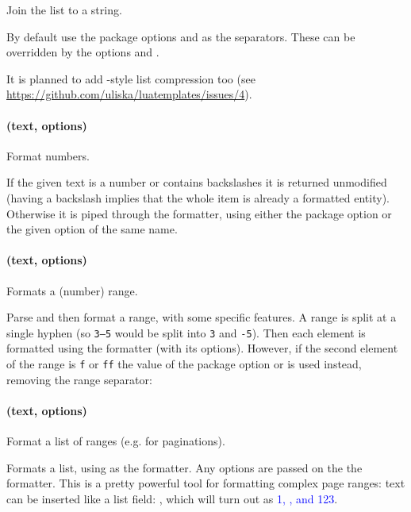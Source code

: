 \documentclass{scrartcl}
\begin{document}
Join the list to a string.

By default use the package options  and 
as the separators. These can be overridden  by the options 
and .

It is planned to add -style list compression too (see
\url{https://github.com/uliska/luatemplates/issues/4}).

\paragraph{ (text, options)}

Format numbers.

If the given text is a number or contains backslashes it is returned unmodified
(having a backslash implies that the whole item is already a formatted
entity). Otherwise it is piped through the  formatter, using either
the package option  or the given option of the same name.


\paragraph{ (text, options)}

Formats a (number) range.

Parse and then format a range, with some specific features.  A range is split at
a single hyphen (so \texttt{3--5} would be split into \texttt{3} and
\texttt{-5}).  Then each element is formatted using the 
formatter (with its options).  However, if the second element of the range is
\texttt{f} or \texttt{ff} the value of the package option 
or  is used instead, removing the range separator:


\paragraph{ (text, options)}

Format a list of ranges (e.g. for paginations).

Formats a list, using  as the formatter.  Any options are passed
on the the  formatter.  This is a pretty powerful tool for
formatting complex page ranges: text can be inserted like a 
list field:
\texttt{}, which will turn out as
\textcolor{blue}{1, ,  and 123}.%
\end{document}
